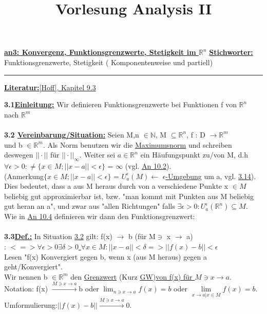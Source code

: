 \documentclass[]{scrartcl}
\title{Vorlesung Analysis II}
\begin{document}
	
	\textbf{\underline{an3: Konvergenz, Funktionsgrenzwerte, Stetigkeit im $\mathbb{R}^n$}}
	\textbf{\underline{Stichworter:}} Funktionsgrenzwerte, Stetigkeit ( Komponentenweise und partiell)
	
	\medskip\hrule\medskip
	
	\textbf{\underline{Literatur:}}\ul{[Hoff], Kapitel 9.3}
	
	\textbf{3.1\underline{Einleitung:}} Wir definieren Funktionsgrenzwerte bei Funktionen f von $\mathbb{R}^n$ nach $\mathbb{R}^m$\\
	\\

	\textbf{3.2 \underline{Vereinbarung/Situation:}} Seien M,n $\in \mathbb{N}$, M $\subseteq \mathbb{R}^n$, f : D $\rightarrow \mathbb{R}^m$ \\
	und b $\in \mathbb{R}^m$. Als Norm benutzen wir die \ul{Maximumsnorm} und schreiben deswegen $||\cdot||$ für $||\cdot||_\infty$. Weiter sei $a \in \mathbb{R}^n$ ein Häufungspunkt zu/von M, d.h $\forall \epsilon > 0 : \neq $\ul{$\{x\in M; ||x-a||<\epsilon\}$} 
	= $\infty$ (vgl.  \ul{An 10.2}).\\
	(Anmerkung\ul{$\{x\in M; ||x-a||<\epsilon\}$} = \ul{$U^\epsilon_a(M)$}$\leftarrow$ \ul{$\epsilon$-Umgebung} um a, vgl. \ul{3.14}).\\
	Dies bedeutet, dass a aus M heraus durch von a verschiedene Punkte x $\in M$ beliebig gut approximierbar ist, bzw. "man kommt mit Punkten aus M beliebig gut heran an a", und zwar aus "allen Richtungen" falls $\exists \epsilon > 0 : U^\epsilon_a(\mathbb{R}^n)\subseteq M$.\\
	Wie in \ul{An 10.4} definieren wir dann den Funktionsgrenzwert:
	\\\\
		
	\textbf{3.3\underline{Def.:}} In Situation \ul{3.2} gilt: f(x) $\rightarrow$ b (für M$\ni$ x $\rightarrow$ a)\\
	: \ul{$ <=>\forall \epsilon > 0 \exists \delta > 0$ \hspace{5mm} $ \forall x \in M: ||x-a|| < \delta  => || f(x) - b || < \epsilon$}\\
	Lesen "f(x) Konvergiert gegen b, wenn x (aus M heraus) gegen a geht/Konvergiert".\\
	Wir nennen b $\in \mathbb{R}^m$ den  \ul{Grenzwert} (Kurz \ul{GW})\ul{von f(x) für $M \ni x \rightarrow a.$}\\
	Notation: f(x) $\xrightarrow[]{M\ni x \rightarrow a}$b oder $\lim_{n \ni x \rightarrow a} f(x)=b$ oder $\lim\limits_{x\rightarrow a|x\in M}f(x)=b.$\\
	Umformulierung:$||f(x)-b||\xrightarrow{M\ni x\rightarrow a}0.$\\\\
	
\end{document}
